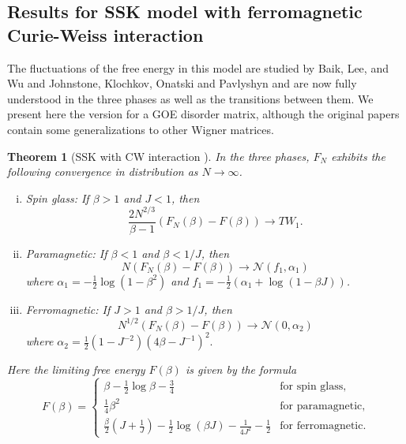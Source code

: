 \documentclass[11pt]{article}
\numberwithin{equation}{section}
\newcommand{\beq}{ \begin{equation} }
\newcommand{\eeq}{ \end{equation} }
\def \a {\alpha}
\def \b {\beta}
\def \cN {\mathcal{N}}
\newtheorem{theorem}{Theorem}[section]
\theoremstyle{remark}
\begin{document}
\subsection{Results for SSK model with ferromagnetic Curie-Weiss interaction}\label{subsec:SSKferro}

The fluctuations of the free energy in this model are studied by Baik, Lee, and Wu \cite{BL17,BLW18} and Johnstone, Klochkov, Onatski and Pavlyshyn \cite{JKOP2} and are now fully understood in the three phases as well as the transitions between them.  We present here the version for a GOE disorder matrix, although the original papers contain some generalizations to other Wigner matrices.

\begin{theorem}[SSK with CW interaction \cite{BL17}] In the three phases, $F_N$ exhibits the following convergence in distribution as $N\to\infty$. 
\begin{enumerate}[(i)]
\item Spin glass: If $\b>1$ and $J<1$, then
\beq
\frac{2N^{2/3}}{\b-1}(F_N(\b)-F(\b))\to TW_1.
\eeq
\item Paramagnetic: If $\b<1$ and $\b<1/J$, then
\beq
N(F_N(\b)-F(\b))\to\cN(f_1,\a_1)
\eeq
where $\a_1=-\frac12\log(1-\b^2)$ and $f_1=-\frac12(\a_1+\log(1-\b J))$.
\item Ferromagnetic: If $J>1$ and $\b>1/J$, then
\beq
N^{1/2}(F_N(\b)-F(\b))\to\cN(0,\a_2)
\eeq
where $\a_2=\frac12(1-J^{-2})(4\b-J^{-1})^2.$
\end{enumerate}
Here the limiting free energy $F(\b)$ is given by the formula
\beq\label{eq:F(beta)SSK+CW} 
F(\b)=\begin{cases} \b-\frac12\log\b-\frac34&\text{for spin glass,}\\
\frac14\b^2&\text{for paramagnetic,}\\
\frac\b2(J+\frac1J)-\frac12\log(\b J)-\frac{1}{4J^2}-\frac12&\text{for ferromagnetic.}
\end{cases}
\eeq
\end{theorem}
\end{document}

